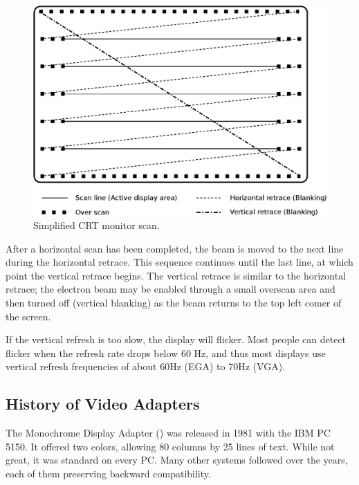 \documentclass[book.tex]{subfiles}
\begin{document}
\begin{figure}[H]
\centering
\includegraphics[width=\textwidth]{imgs/drawings/monitor.eps}
\caption{Simplified CRT monitor scan.}
\label{fig:monitor}
\end{figure}

\par
After a horizontal scan has been completed, the beam is moved to the next
line during the horizontal retrace. This sequence continues until the last line, at which point the vertical retrace begins. The vertical retrace is similar to the horizontal retrace; the electron beam may be enabled through a small overscan area and then turned off (vertical blanking) as the beam returns to the top left comer of the screen.\\

\par
If the vertical refresh is too slow, the display will flicker. Most people can detect flicker when the refresh rate drops below 60 Hz, and thus most displays use vertical refresh frequencies of about 60Hz (EGA) to 70Hz (VGA). 



  \subsection{History of Video Adapters}

The Monochrome Display Adapter () was released in 1981 with the IBM PC 5150. It offered two colors, allowing 80 columns by 25 lines of text.  While not great, it was standard on every PC. Many other systems followed over the years, each of them preserving backward compatibility.
\end{document}
